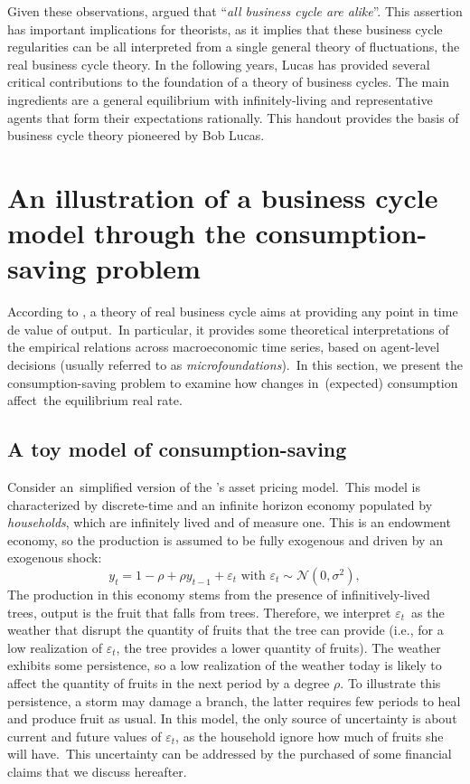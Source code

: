 \documentclass[a4paper,12pt]{article}%
\begin{document}
Given these observations, \cite{lucas1977understanding} argued that
\textquotedblleft\textit{all business cycle are alike}\textquotedblright. This
assertion has important implications for theorists, as it implies that these
business cycle regularities can be all interpreted from a single general
theory of fluctuations, the real business cycle theory. In the following
years, Lucas has provided several critical contributions to the foundation of
a theory of business cycles. The main ingredients are a general equilibrium
with infinitely-living and representative agents that form their expectations
rationally. This handout provides the basis of business cycle theory pioneered
by Bob Lucas.

\newpage

\section{An illustration of a business cycle model through the
consumption-saving problem}

According to \cite{lucas1977understanding}, a theory of real business cycle
aims at providing any point in time de value of output.\ In particular, it
provides some theoretical interpretations of the empirical relations across
macroeconomic time series, based on agent-level decisions (usually referred to
as \textit{microfoundations}).\ In this section, we present the
consumption-saving problem to examine how changes in\ (expected) consumption
affect\ the equilibrium real rate.

\subsection{A toy model of consumption-saving}

Consider an\ simplified version of the \cite{lucas1978asset}'s asset pricing
model.\ This model is characterized by discrete-time and an infinite horizon
economy populated by \textit{households}, which are infinitely lived and of
measure one. This is an endowment economy, so the production is assumed to be
fully exogenous and driven by an exogenous shock:%
\begin{equation}
y_{t}=1-\rho+\rho y_{t-1}+\varepsilon_{t}\text{ with }\varepsilon_{t}%
\sim\mathcal{N}(0,\sigma^{2}), \label{eq: exo cons}%
\end{equation}
The production in this economy stems from the presence of infinitively-lived
trees, output is the fruit that falls from trees. Therefore, we interpret
$\varepsilon_{t}$\ as the weather that disrupt the quantity of fruits that the
tree can provide (i.e., for a low realization of $\varepsilon_{t}$, the tree
provides a lower quantity of fruits). The weather exhibits some persistence,
so a low realization of the weather today is likely to affect the quantity of
fruits in the next period by a degree $\rho$. To illustrate this persistence,
a storm may damage a branch, the latter requires few periods to heal and
produce fruit as usual. In this model, the only source of uncertainty is about
current and future values of $\varepsilon_{t}$, as the household ignore how
much of fruits she will have.\ This uncertainty can be addressed by the
purchased of some financial claims that we discuss hereafter.
\end{document}

